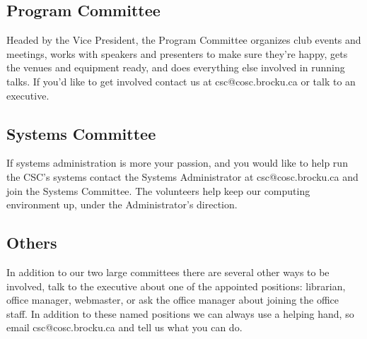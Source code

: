 \documentclass[10pt,letterpaper]{article}
\begin{document}
\begin{multicols}{3}
\subsection*{Program Committee}

Headed by the Vice President, the Program Committee organizes club events and
meetings, works with speakers and presenters to make sure they're happy, gets
the venues and equipment ready, and does everything else involved in running talks.
If you'd like to get involved contact us at csc@cosc.brocku.ca or talk to an executive.

\subsection*{Systems Committee}

If systems administration is more your passion, and you would like to help run
the CSC's systems contact the Systems Administrator at
csc@cosc.brocku.ca and join the Systems Committee. The volunteers
help keep our computing environment up, under the Administrator's
direction.

\subsection*{Others}

In addition to our two large committees there are several other ways to be
involved, talk to the executive about one of the appointed positions:
librarian, office manager, webmaster, or ask the office manager about joining
the office staff. In addition to these named positions we can always use a
helping hand, so email csc@cosc.brocku.ca and tell us what you can do.

\end{multicols}

\pagebreak
\end{document}

